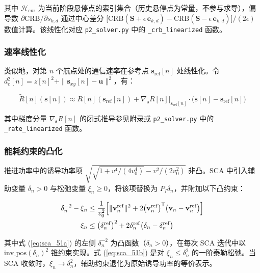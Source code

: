其中 $\mathcal{H}_{\mathrm{cur}}$ 为当前阶段悬停点的索引集合（历史悬停点为常量，不参与求导），偏导数 $\partial\mathrm{CRB}/\partial s_{k,d}$ 通过中心差分 $\bigl[\mathrm{CRB}(\mathbf{S}+\epsilon\,\mathbf{e}_{k,d})-\mathrm{CRB}(\mathbf{S}-\epsilon\,\mathbf{e}_{k,d})\bigr]/(2\epsilon)$ 数值计算。该线性化对应 \texttt{p2\_solver.py} 中的 \texttt{\_crb\_linearized} 函数。

\subsubsection{速率线性化}

类似地，对第 $n$ 个航点处的通信速率在参考点 $\mathbf{s}_{\mathrm{ref}}[n]$ 处线性化。令 $d_c^2[n]=z[n]^2+\|\mathbf{s}_{xy}[n]-\mathbf{u}\|^2$，有：

\begin{equation}
\widetilde{R}[n](\mathbf{s}[n])\approx R[n](\mathbf{s}_{\mathrm{ref}}[n])+
\nabla_{\mathbf{s}}R[n]\bigr|_{\mathbf{s}_{\mathrm{ref}}[n]}\!\cdot\bigl(\mathbf{s}[n]-\mathbf{s}_{\mathrm{ref}}[n]\bigr)
\label{eq:rate_linearization}
\end{equation}

其中梯度分量 $\nabla_{\mathbf{s}}R[n]$ 的闭式推导参见附录或 \texttt{p2\_solver.py} 中的 \texttt{\_rate\_linearized} 函数。

\subsubsection{能耗约束的凸化}

推进功率中的诱导功率项 $\sqrt{\sqrt{1+v^4/(4v_0^4)}-v^2/(2v_0^2)}$ 非凸。SCA 中引入辅助变量 $\delta_n>0$ 与松弛变量 $\xi_n\geq 0$，将该项替换为 $P_I\delta_n$，并附加以下凸约束\cite{Zeng2016}：

\begin{align}
\delta_n^{-2}-\xi_n&\leq\frac{1}{v_0^2}\Bigl[\|\mathbf{v}_n^{\mathrm{ref}}\|^2+
2\bigl(\mathbf{v}_n^{\mathrm{ref}}\bigr)^{\mathsf{T}}\bigl(\mathbf{v}_n-\mathbf{v}_n^{\mathrm{ref}}\bigr)\Bigr]
\label{eq:sca_51a}\\
\xi_n&\leq\bigl(\delta_n^{\mathrm{ref}}\bigr)^2+2\delta_n^{\mathrm{ref}}\bigl(\delta_n-\delta_n^{\mathrm{ref}}\bigr)
\label{eq:sca_51b}
\end{align}

其中式 (\ref{eq:sca_51a}) 的左侧 $\delta_n^{-2}$ 为凸函数（$\delta_n>0$），在每次 SCA 迭代中以 $\mathrm{inv\_pos}(\delta_n)^2$ 锥约束实现。式 (\ref{eq:sca_51b}) 是对 $\xi_n\leq\delta_n^2$ 的一阶泰勒松弛。当 SCA 收敛时，$\xi_n\to\delta_n^2$，辅助约束退化为原始诱导功率的等价表示。

